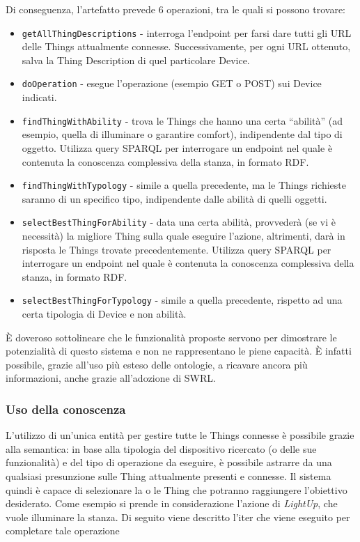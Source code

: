 \documentclass[12pt,a4paper,openright,oneside]{report}
\newcommand{\quotes}[1]{``#1''}
\begin{document}
Di conseguenza, l'artefatto prevede 6 operazioni, tra le quali si possono trovare:
\begin{itemize}
	\item \texttt{getAllThingDescriptions} - interroga l'endpoint per farsi dare tutti gli URL delle Things attualmente connesse. Successivamente, per ogni URL ottenuto, salva la Thing Description di quel particolare Device.
	\item \texttt{doOperation} - esegue l'operazione (esempio GET o POST) sui Device indicati.
	\item \texttt{findThingWithAbility} - trova le Things che hanno una certa \quotes{abilità} (ad esempio, quella di illuminare o garantire comfort), indipendente dal tipo di oggetto. Utilizza query SPARQL per interrogare un endpoint nel quale è contenuta la conoscenza complessiva della stanza, in formato RDF.
	\item \texttt{findThingWithTypology} - simile a quella precedente, ma le Things richieste saranno di un specifico tipo, indipendente dalle abilità di quelli oggetti.
	\item \texttt{selectBestThingForAbility} - data una certa abilità, provvederà (se vi è necessità) la migliore Thing sulla quale eseguire l'azione, altrimenti, darà in risposta le Things trovate precedentemente. Utilizza query SPARQL per interrogare un endpoint nel quale è contenuta la conoscenza complessiva della stanza, in formato RDF.
	\item \texttt{selectBestThingForTypology} - simile a quella precedente, rispetto ad una certa tipologia di Device e non abilità.
\end{itemize}

È doveroso sottolineare che le funzionalità proposte servono per dimostrare le potenzialità di questo sistema e non ne rappresentano le piene capacità. È infatti possibile, grazie all'uso più esteso delle ontologie, a ricavare ancora più informazioni, anche grazie all'adozione di SWRL.


\subsubsection{Uso della conoscenza}
L'utilizzo di un'unica entità per gestire tutte le Things connesse è possibile grazie alla semantica: in base alla tipologia del dispositivo ricercato (o delle sue funzionalità) e del tipo di operazione da eseguire, è possibile astrarre da una qualsiasi presunzione sulle Thing attualmente presenti e connesse. Il sistema quindi è capace di selezionare la o le Thing che potranno raggiungere l'obiettivo desiderato. Come esempio si prende in considerazione l'azione di \textit{LightUp}, che vuole illuminare la stanza. Di seguito viene descritto l'iter che viene eseguito per completare tale operazione\\
\end{document}
